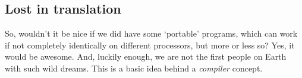 \documentclass[../../why-computer.tex]{subfiles}
\begin{document}
        \subsection{Lost in translation}\label{subsection:Lost-in-translation}

        So, wouldn't it be nice if we did have some `portable' programs, which can work if not completely identically on different processors, but more or less so? Yes,
        it would be awesome. And, luckily enough, we are not the first people on Earth with such wild dreams. This is a basic idea behind a \emph{compiler} concept.
\end{document}
